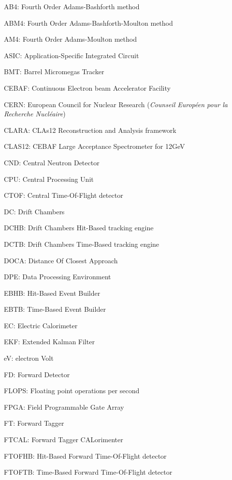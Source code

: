 {\setlength{\parskip}{0cm}
    AB4: Fourth Order Adams-Bashforth method

    ABM4: Fourth Order Adams-Bashforth-Moulton method
    
    AM4: Fourth Order Adams-Moulton method

    ASIC: Application-Specific Integrated Circuit
    
    BMT: Barrel Micromegas Tracker
    
    CEBAF: Continuous Electron beam Accelerator Facility
    
    CERN: European Council for Nuclear Research (\textit{Counseil Europ\'een pour la Recherche Nucléaire})
    
    CLARA: CLAs12 Reconstruction and Analysis framework
    
    CLAS12: CEBAF Large Acceptance Spectrometer for 12GeV
    
    CND: Central Neutron Detector
    
    CPU: Central Processing Unit
    
    CTOF: Central Time-Of-Flight detector
    
    DC: Drift Chambers
    
    DCHB: Drift Chambers Hit-Based tracking engine
    
    DCTB: Drift Chambers Time-Based tracking engine
    
    DOCA: Distance Of Closest Approach
    
    DPE: Data Processing Environment
    
    EBHB: Hit-Based Event Builder
    
    EBTB: Time-Based Event Builder
    
    EC: Electric Calorimeter
    
    EKF: Extended Kalman Filter

    eV: electron Volt
    
    FD: Forward Detector
    
    FLOPS: Floating point operations per second
    
    FPGA: Field Programmable Gate Array
    
    FT: Forward Tagger
    
    FTCAL: Forward Tagger CALorimenter
    
    FTOFHB: Hit-Based Forward Time-Of-Flight detector
    
    FTOFTB: Time-Based Forward Time-Of-Flight detector
    
}
